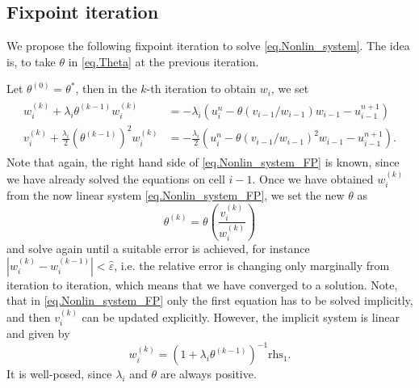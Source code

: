 \documentclass[3p]{scrartcl}%
\makeatletter
\def\@starttocbutdonotshowit#1{%
    \begingroup
    \makeatletter
    \if@filesw
    \expandafter\newwrite\csname tf@#1\endcsname
    \immediate\openout \csname tf@#1\endcsname \jobname.#1\relax
    \fi
    \@nobreakfalse
    \endgroup}
\newcommand{\listoffigurenumbernames}{%
    \@starttocbutdonotshowit{lfn}%
}
\makeatother
\begin{document}
    \subsection{Fixpoint iteration}
    We propose the following fixpoint iteration to solve \eqref{eq.Nonlin_system}.
    The idea is, to take $\theta$ in \eqref{eq.Theta} at the previous iteration.

    Let $\theta^{(0)} = \theta^\ast$, then in the $k$-th iteration to obtain $w_i$, we set
    \begin{align}
        \label{eq.Nonlin_system_FP}
        \begin{split}
            w_i^{(k)} + \lambda_i \theta^{(k-1)} w_i^{(k)} &= - \lambda_i \left(u_i^n - \theta(v_{i-1}/w_{i-1})w_{i-1} - u_{i-1}^{n+1}\right)\\
            v_i^{(k)} + \frac{\lambda_i}{2} (\theta^{(k-1)})^2 w_i^{(k)} &= - \frac{\lambda_i}{2} \left(u_i^n - \theta(v_{i-1}/w_{i-1})^2w_{i-1} - u_{i-1}^{n+1}\right).
        \end{split}
    \end{align}
    Note that again, the right hand side of \eqref{eq.Nonlin_system_FP} is known, since we have already solved the equations on cell $i-1$.
    Once we have obtained $w_i^{(k)}$ from the now linear system \eqref{eq.Nonlin_system_FP}, we set the new $\theta$ as
    \begin{equation}
        \theta^{(k)} = \theta\left(\frac{v_i^{(k)}}{w_i^{(k)}}\right)
    \end{equation}
    and solve again until a suitable error is achieved, for instance $| w_i^{(k)} - w_i^{(k-1)}| < \hat{\varepsilon}$, i.e. the relative error is changing only marginally from iteration to iteration, which means that we have converged to a solution.
    Note, that in \eqref{eq.Nonlin_system_FP} only the first equation has to be solved implicitly, and then $v_i^{(k)}$ can be updated explicitly.
    However, the implicit system is linear and given by
    \begin{equation}
         w_i^{(k)} = \left(1 + \lambda_i \theta^{(k-1)}\right)^{-1}\text{rhs}_1.
    \end{equation}
    It is well-posed, since $\lambda_i$ and $\theta$ are always positive.




\end{document}
